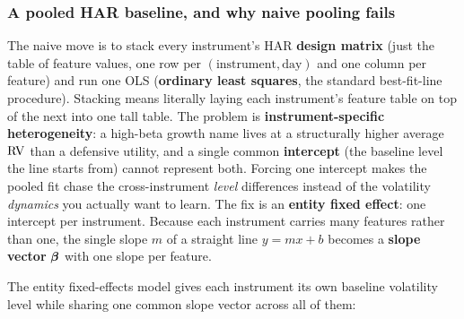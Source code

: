\subsubsection*{A pooled HAR baseline, and why naive pooling fails}

The naive move is to stack every instrument's HAR \textbf{design matrix} (just
the table of feature values, one row per $(\text{instrument},\text{day})$ and one
column per feature) and run one OLS (\textbf{ordinary least squares}, the
standard best-fit-line procedure).  Stacking means literally laying each
instrument's feature table on top of the next into one tall table.  The problem is
\textbf{instrument-specific heterogeneity}: a high-beta growth name
lives at a structurally higher average $\operatorname{RV}$ than a defensive utility, and a
single common \textbf{intercept} (the baseline level the line starts from) cannot
represent both.  Forcing one intercept makes the
pooled fit chase the cross-instrument \emph{level} differences instead of the
volatility \emph{dynamics} you actually want to learn.  The fix is an
\textbf{entity fixed effect}: one intercept per instrument.  Because each
instrument carries many features rather than one, the single slope $m$ of a
straight line $y=mx+b$ becomes a \textbf{slope vector} $\bm{\beta}$ with one slope per
feature.

The entity fixed-effects model gives each instrument its own
baseline volatility level while sharing one common slope vector across all of
them:

